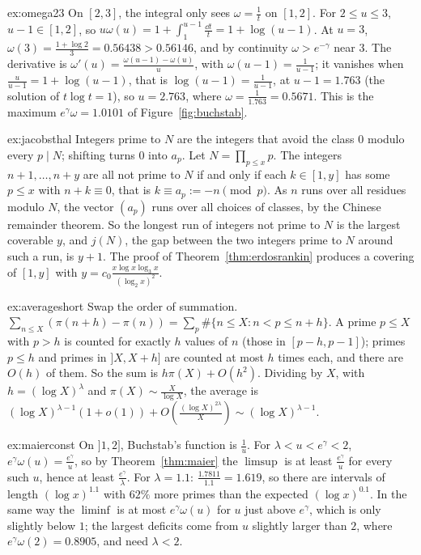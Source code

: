 \begin{solution}{ex:omega23}
\idea On $[2,3]$, the integral only sees $\omega=\frac1t$ on $[1,2]$.
\writeup For $2\le u\le3$, $u-1\in[1,2]$, so $u\omega(u)=1+\int_1^{u-1}\frac{\dd t}t=1+\log(u-1)$. At $u=3$, $\omega(3)=\frac{1+\log2}3=0.56438>0.56146$, and by continuity $\omega>e^{-\gamma}$ near $3$. The derivative is $\omega'(u)=\frac{\omega(u-1)-\omega(u)}u$, with $\omega(u-1)=\frac1{u-1}$; it vanishes when $\frac u{u-1}=1+\log(u-1)$, that is $\log(u-1)=\frac1{u-1}$, at $u-1=1.763$ (the solution of $t\log t=1$), so $u=2.763$, where $\omega=\frac1{1.763}=0.5671$. This is the maximum $e^\gamma\omega=1.0101$ of Figure~\ref{fig:buchstab}.
\end{solution}

\begin{solution}{ex:jacobsthal}
\idea Integers prime to $N$ are the integers that avoid the class $0$ modulo every $p\mid N$; shifting turns $0$ into $a_p$.
\writeup Let $N=\prod_{p\le x}p$. The integers $n+1,\dots,n+y$ are all not prime to $N$ if and only if each $k\in[1,y]$ has some $p\le x$ with $n+k\equiv0$, that is $k\equiv a_p:=-n\pmod p$. As $n$ runs over all residues modulo $N$, the vector $(a_p)$ runs over all choices of classes, by the Chinese remainder theorem. So the longest run of integers not prime to $N$ is the largest coverable $y$, and $j(N)$, the gap between the two integers prime to $N$ around such a run, is $y+1$. The proof of Theorem~\ref{thm:erdosrankin} produces a covering of $[1,y]$ with $y=c_0\frac{x\log x\log_3x}{(\log_2x)^2}$.
\end{solution}

\begin{solution}{ex:averageshort}
\idea Swap the order of summation.
\writeup $\sum_{n\le X}(\pi(n+h)-\pi(n))=\sum_p\#\{n\le X:n<p\le n+h\}$. A prime $p\le X$ with $p>h$ is counted for exactly $h$ values of $n$ (those in $[p-h,p-1]$); primes $p\le h$ and primes in $]X,X+h]$ are counted at most $h$ times each, and there are $O(h)$ of them. So the sum is $h\pi(X)+O(h^2)$. Dividing by $X$, with $h=(\log X)^\lambda$ and $\pi(X)\sim\frac X{\log X}$, the average is $(\log X)^{\lambda-1}(1+o(1))+O(\frac{(\log X)^{2\lambda}}X)\sim(\log X)^{\lambda-1}$.
\end{solution}

\begin{solution}{ex:maierconst}
\idea On $]1,2]$, Buchstab's function is $\frac1u$.
\writeup For $\lambda<u<e^\gamma<2$, $e^\gamma\omega(u)=\frac{e^\gamma}u$, so by Theorem~\ref{thm:maier} the $\limsup$ is at least $\frac{e^\gamma}u$ for every such $u$, hence at least $\frac{e^\gamma}\lambda$. For $\lambda=1.1$: $\frac{1.7811}{1.1}=1.619$, so there are intervals of length $(\log x)^{1.1}$ with $62\%$ more primes than the expected $(\log x)^{0.1}$. In the same way the $\liminf$ is at most $e^\gamma\omega(u)$ for $u$ just above $e^\gamma$, which is only slightly below $1$; the largest deficits come from $u$ slightly larger than $2$, where $e^\gamma\omega(2)=0.8905$, and need $\lambda<2$.
\end{solution}

